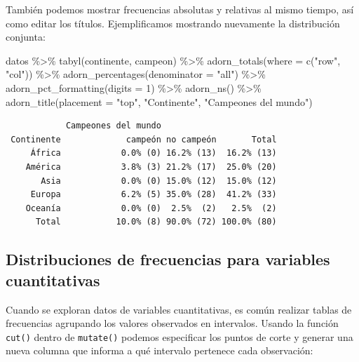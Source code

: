 \documentclass[
]{book}
\newenvironment{Shaded}{\begin{snugshade}}{\end{snugshade}}
\newcommand{\AttributeTok}[1]{\textcolor[rgb]{0.77,0.63,0.00}{#1}}
\newcommand{\DecValTok}[1]{\textcolor[rgb]{0.00,0.00,0.81}{#1}}
\newcommand{\FunctionTok}[1]{\textcolor[rgb]{0.00,0.00,0.00}{#1}}
\newcommand{\NormalTok}[1]{#1}
\newcommand{\SpecialCharTok}[1]{\textcolor[rgb]{0.00,0.00,0.00}{#1}}
\newcommand{\StringTok}[1]{\textcolor[rgb]{0.31,0.60,0.02}{#1}}
\begin{document}
También podemos mostrar frecuencias absolutas y relativas al mismo tiempo, así como editar los títulos. Ejemplificamos mostrando nuevamente la distribución conjunta:

\begin{Shaded}
\begin{Highlighting}[]
\NormalTok{datos }\SpecialCharTok{\%\textgreater{}\%} 
  \FunctionTok{tabyl}\NormalTok{(continente, campeon) }\SpecialCharTok{\%\textgreater{}\%} 
  \FunctionTok{adorn\_totals}\NormalTok{(}\AttributeTok{where =} \FunctionTok{c}\NormalTok{(}\StringTok{"row"}\NormalTok{, }\StringTok{"col"}\NormalTok{)) }\SpecialCharTok{\%\textgreater{}\%} 
    \FunctionTok{adorn\_percentages}\NormalTok{(}\AttributeTok{denominator =} \StringTok{"all"}\NormalTok{) }\SpecialCharTok{\%\textgreater{}\%} 
  \FunctionTok{adorn\_pct\_formatting}\NormalTok{(}\AttributeTok{digits =} \DecValTok{1}\NormalTok{) }\SpecialCharTok{\%\textgreater{}\%} 
    \FunctionTok{adorn\_ns}\NormalTok{() }\SpecialCharTok{\%\textgreater{}\%} 
    \FunctionTok{adorn\_title}\NormalTok{(}\AttributeTok{placement =} \StringTok{"top"}\NormalTok{, }\StringTok{"Continente"}\NormalTok{, }\StringTok{"Campeones del mundo"}\NormalTok{)}
\end{Highlighting}
\end{Shaded}

\begin{verbatim}
            Campeones del mundo                       
 Continente             campeón no campeón       Total
     África            0.0% (0) 16.2% (13)  16.2% (13)
    América            3.8% (3) 21.2% (17)  25.0% (20)
       Asia            0.0% (0) 15.0% (12)  15.0% (12)
     Europa            6.2% (5) 35.0% (28)  41.2% (33)
    Oceanía            0.0% (0)  2.5%  (2)   2.5%  (2)
      Total           10.0% (8) 90.0% (72) 100.0% (80)
\end{verbatim}

\hypertarget{distribuciones-de-frecuencias-para-variables-cuantitativas}{%
\subsection{Distribuciones de frecuencias para variables cuantitativas}\label{distribuciones-de-frecuencias-para-variables-cuantitativas}}

Cuando se exploran datos de variables cuantitativas, es común realizar tablas de frecuencias agrupando los valores observados en intervalos. Usando la función \texttt{cut()} dentro de \texttt{mutate()} podemos especificar los puntos de corte y generar una nueva columna que informa a qué intervalo pertenece cada observación:
\end{document}
